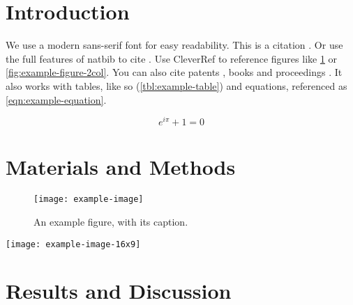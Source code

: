 \documentclass[
    9pt,            %
    twocolumn,      %
    commun,         %
    lineno,         %
    tocfig,         %
]{pi-article}
\begin{document}



\section{Introduction}

We use a modern sans-serif font for easy readability. This is a citation
\citep{article1}. Or use the full features of natbib to cite \citet{article2}.
Use CleverRef to reference figures like \cref{fig:example-figure} or
\cref{fig:example-figure-2col}. You can also cite patents \citep{patent,
patent2}, books \citep{book} and proceedings \citep{inproceedings}. It also
works with tables, like so (\cref{tbl:example-table}) and equations, referenced
as \cref{eqn:example-equation}.

\begin{equation}\label{eqn:example-equation}
    e^{i\pi} + 1 = 0
\end{equation}

\lipsum[1-1] %

\section{Materials and Methods}
\lipsum[2-4] %

\begin{figure}[!htb]
    \centering
    \texttt{[image: example-image]}
    \caption{%
        An example figure, with its caption.
    }\label{fig:example-figure}
\end{figure}

\begin{figure*}[!htb]
    \centering
    \texttt{[image: example-image-16x9]}
    \caption{%
        An example 2-column figure, with its caption. In 1-column mode it appears as a normal figure.
    }\label{fig:example-figure-2col}
\end{figure*}

\lipsum[2-4] %

\section{Results and Discussion}
\lipsum[4-5] %
\end{document}
